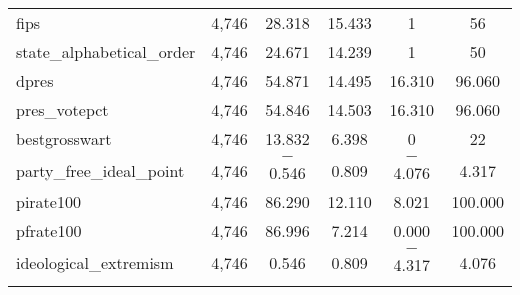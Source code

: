\documentclass[12pt]{article}
\begin{document}
\begin{table}[!htbp]
\begin{tabular}{@{\extracolsep{5pt}}lccccc}
		fips & 4,746 & 28.318 & 15.433 & 1 & 56 \\ 
		state\_alphabetical\_order & 4,746 & 24.671 & 14.239 & 1 & 50 \\ 
		dpres & 4,746 & 54.871 & 14.495 & 16.310 & 96.060 \\ 
		pres\_votepct & 4,746 & 54.846 & 14.503 & 16.310 & 96.060 \\ 
		bestgrosswart & 4,746 & 13.832 & 6.398 & 0 & 22 \\ 
		party\_free\_ideal\_point & 4,746 & $-$0.546 & 0.809 & $-$4.076 & 4.317 \\ 
		pirate100 & 4,746 & 86.290 & 12.110 & 8.021 & 100.000 \\ 
		pfrate100 & 4,746 & 86.996 & 7.214 & 0.000 & 100.000 \\ 
		ideological\_extremism & 4,746 & 0.546 & 0.809 & $-$4.317 & 4.076 \\ 
		\hline \\[-1.8ex] 
	\end{tabular} 
\end{table} 
\end{document}
